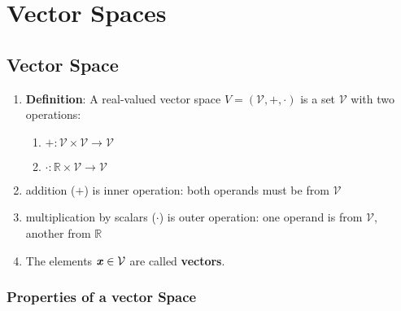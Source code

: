 \chapter{Vector Spaces}


\section{Vector Space}

\begin{enumerate}
    \item \textbf{Definition}: A real-valued vector space $V = (\mathcal{V}, +, \cdot)$ is a set $\mathcal{V}$ with two operations:
    \hfill \cite{mfml/book/mml/Deisenroth-Faisal-Ong}
    \begin{enumerate}
        \item[] $+ :  \mathcal{V} \times \mathcal{V} \to \mathcal{V}$
        \hfill \cite{mfml/book/mml/Deisenroth-Faisal-Ong}

        \item[] $\cdot: \mathbb{R} \times \mathcal{V} \to \mathcal{V}$ 
        \hfill \cite{mfml/book/mml/Deisenroth-Faisal-Ong}
    \end{enumerate}


    \item addition ($+$) is inner operation: both operands must be from $\mathcal{V}$
    \hfill \cite{mfml/book/mml/Deisenroth-Faisal-Ong}

    \item multiplication by scalars ($\cdot$) is outer operation: one operand is from $\mathcal{V}$, another from $\mathbb{R}$
    \hfill \cite{mfml/book/mml/Deisenroth-Faisal-Ong}

    \item The elements $\text{\textbf{\textit{x}}} \in \mathcal{V}$ are called \textbf{vectors}.
    \hfill \cite{mfml/book/mml/Deisenroth-Faisal-Ong}
\end{enumerate}


\subsection{Properties of a vector Space}

